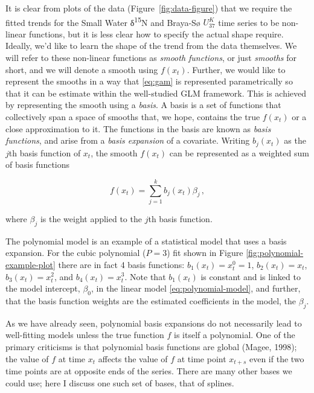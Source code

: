 \documentclass[12pt,]{article}
\newcommand{\uk}{\ensuremath{\mathit{U}^{\mathit{K}}_{\mathup{37}}}}
\begin{document}
It is clear from plots of the data (Figure~\ref{fig:data-figure}) that
we require the fitted trends for the Small Water δ\textsuperscript{15}N
and Braya-Sø \uk{} time series to be non-linear functions, but it is
less clear how to specify the actual shape require. Ideally, we'd like
to learn the shape of the trend from the data themselves. We will refer
to these non-linear functions as \emph{smooth functions}, or just
\emph{smooths} for short, and we will denote a smooth using \(f(x_t)\).
Further, we would like to represent the smooths in a way that
\eqref{eq:gam} is represented parametrically so that it can be estimate
within the well-studied GLM framework. This is achieved by representing
the smooth using a \emph{basis}. A basis is a set of functions that
collectively span a space of smooths that, we hope, contains the true
\(f(x_t)\) or a close approximation to it. The functions in the basis
are known as \emph{basis functions}, and arise from a \emph{basis
expansion} of a covariate. Writing \(b_j(x_t)\) as the \(j\)th basis
function of \(x_t\), the smooth \(f(x_t)\) can be represented as a
weighted sum of basis functions

\begin{equation*}
f(x_t) = \sum_{j = 1}^{k} b_j(x_t) \beta_j \,,
\end{equation*}

where \(\beta_j\) is the weight applied to the \(j\)th basis function.

The polynomial model is an example of a statistical model that uses a
basis expansion. For the cubic polynomial (\(P = 3\)) fit shown in
Figure \ref{fig:polynomial-example-plot} there are in fact 4 basis
functions: \(b_1(x_t) = x_t^0 = 1\), \(b_2(x_t) = x_t\),
\(b_3(x_t) = x^2_t\), and \(b_4(x_t) = x_t^3\). Note that \(b_1(x_t)\)
is constant and is linked to the model intercept, \(\beta_0\), in the
linear model \eqref{eq:polynomial-model}, and further, that the basis
function weights are the estimated coefficients in the model, the
\(\beta_j\).

As we have already seen, polynomial basis expansions do not necessarily
lead to well-fitting models unless the true function \(f\) is itself a
polynomial. One of the primary criticisms is that polynomial basis
functions are global (Magee, 1998); the value of \(f\) at time \(x_t\)
affects the value of \(f\) at time point \(x_{t+s}\) even if the two
time points are at opposite ends of the series. There are many other
bases we could use; here I discuss one such set of bases, that of
splines.
\end{document}
